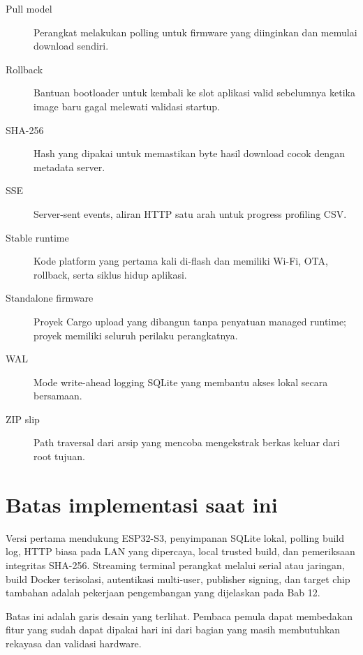 \begin{description}
  \item[Pull model] Perangkat melakukan polling untuk firmware yang diinginkan dan memulai download sendiri.
  \item[Rollback] Bantuan bootloader untuk kembali ke slot aplikasi valid sebelumnya ketika image baru gagal melewati validasi startup.
  \item[SHA-256] Hash yang dipakai untuk memastikan byte hasil download cocok dengan metadata server.
  \item[SSE] Server-sent events, aliran HTTP satu arah untuk progress profiling CSV.
  \item[Stable runtime] Kode platform yang pertama kali di-flash dan memiliki Wi-Fi, OTA, rollback, serta siklus hidup aplikasi.
  \item[Standalone firmware] Proyek Cargo upload yang dibangun tanpa penyatuan managed runtime; proyek memiliki seluruh perilaku perangkatnya.
  \item[WAL] Mode write-ahead logging SQLite yang membantu akses lokal secara bersamaan.
  \item[ZIP slip] Path traversal dari arsip yang mencoba mengekstrak berkas keluar dari root tujuan.
\end{description}

\section{Batas implementasi saat ini}

Versi pertama mendukung ESP32-S3, penyimpanan SQLite lokal, polling build log, HTTP biasa pada LAN yang dipercaya, local trusted build, dan pemeriksaan integritas SHA-256. Streaming terminal perangkat melalui serial atau jaringan, build Docker terisolasi, autentikasi multi-user, publisher signing, dan target chip tambahan adalah pekerjaan pengembangan yang dijelaskan pada Bab 12.

Batas ini adalah garis desain yang terlihat. Pembaca pemula dapat membedakan fitur yang sudah dapat dipakai hari ini dari bagian yang masih membutuhkan rekayasa dan validasi hardware.
